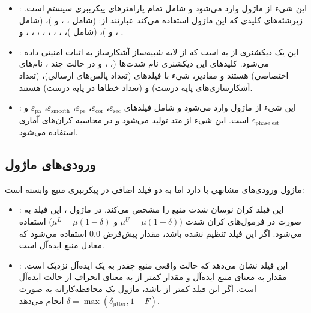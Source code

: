 \begin{itemize}
	\item {}: این شیء از ماژول  وارد می‌شود و شامل تمام پارامترهای پیکرببری سیستم است. زیرشئه‌های کلیدی که این ماژول استفاده می‌کند عبارتند از:  (شامل ، ،  و )،  (شامل ،  و )،  (شامل )، ، ، ، ، ، ، ،  و .
	\item {}: این یک دیکشنری از  به  است که از لایه شبیه‌ساز آشکارساز به اثبات امنیتی داده می‌شود. کلیدهای این دیکشنری نام شدت‌ها (، ،  و در حالت چند ، نام‌های اختصاصی) هستند و مقادیر، شیء  با فیلدهای  (تعداد پالس‌های ارسالی)،  (تعداد آشکارسازی‌های پایه درست) و  (تعداد خطاها در پایه درست) هستند.
	\item {}: این شیء از ماژول  وارد می‌شود و شامل فیلدهای $\varepsilon_{\text{sec}}$، $\varepsilon_{\text{cor}}$، $\varepsilon_{\text{pe}}$، $\varepsilon_{\text{smooth}}$، $\varepsilon_{\text{pa}}$ و $\varepsilon_{\text{phase\_est}}$ است. این شیء از متد  تولید می‌شود و در محاسبه کران‌های آماری استفاده می‌شود.
\end{itemize}

\subsection{ورودی‌های ماژول }

ماژول  ورودی‌های مشابهی با  دارد اما به دو فیلد اضافی در پیکرببری منبع وابسته است:

\begin{itemize}
	\item {}: این فیلد کران نوسان شدت منبع را مشخص می‌کند. در ماژول ، این فیلد به صورت \lr{$\delta$} در فرمول‌های کران شدت ($\mu^U = \mu(1 + \delta)$ و $\mu^L = \mu(1 - \delta)$) استفاده می‌شود. اگر این فیلد تنظیم نشده باشد، مقدار پیش‌فرض 0.0 استفاده می‌شود که معادل منبع ایده‌آل است.
	\item {}: این فیلد نشان می‌دهد که حالت واقعی منبع چقدر به یک  ایده‌آل نزدیک است. مقدار  به معنای منبع ایده‌آل و مقدار کمتر از  به معنای انحراف از حالت ایده‌آل است. اگر این فیلد کمتر از  باشد، ماژول یک  محافظه‌کارانه به صورت $\delta = \max(\delta_{\text{jitter}}, 1 - F)$ انجام می‌دهد.
\end{itemize}

